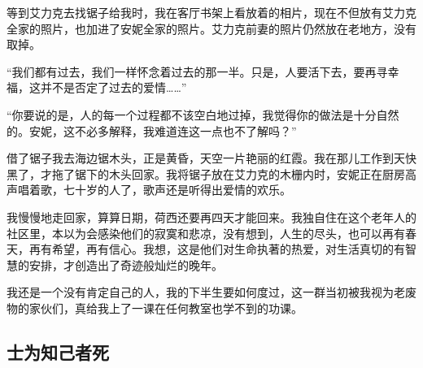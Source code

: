 \par 等到艾力克去找锯子给我时，我在客厅书架上看放着的相片，现在不但放有艾力克全家的照片，也加进了安妮全家的照片。艾力克前妻的照片仍然放在老地方，没有取掉。
\par “我们都有过去，我们一样怀念着过去的那一半。只是，人要活下去，要再寻幸福，这并不是否定了过去的爱情……”
\par “你要说的是，人的每一个过程都不该空白地过掉，我觉得你的做法是十分自然的。安妮，这不必多解释，我难道连这一点也不了解吗？”
\par 借了锯子我去海边锯木头，正是黄昏，天空一片艳丽的红霞。我在那儿工作到天快黑了，才拖了锯下的木头回家。我将锯子放在艾力克的木栅内时，安妮正在厨房高声唱着歌，七十岁的人了，歌声还是听得出爱情的欢乐。
\par 我慢慢地走回家，算算日期，荷西还要再四天才能回来。我独自住在这个老年人的社区里，本以为会感染他们的寂寞和悲凉，没有想到，人生的尽头，也可以再有春天，再有希望，再有信心。我想，这是他们对生命执著的热爱，对生活真切的有智慧的安排，才创造出了奇迹般灿烂的晚年。
\par 我还是一个没有肯定自己的人，我的下半生要如何度过，这一群当初被我视为老废物的家伙们，真给我上了一课在任何教室也学不到的功课。


\subsection{士为知己者死}

